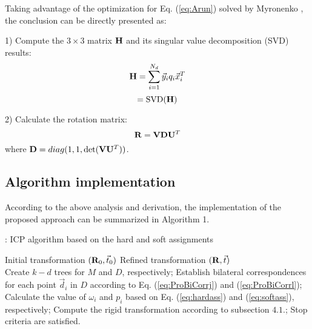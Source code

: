 \documentclass[review]{elsarticle}
\renewcommand{\algorithmicrequire}{\textbf{Input:}}  %
\renewcommand{\algorithmicensure}{\textbf{Output:}} %
\renewcommand{\algorithmicrepeat}{\textbf{Repeat:}} %
\renewcommand{\algorithmicuntil}{\textbf{Until:}} %
\begin{document}
Taking advantage of the optimization for Eq. (\ref{eq:Arun}) solved by Myronenko \cite{Myronenko09}, the conclusion can be directly presented as:

1) Compute the $3 \times 3$ matrix $\bf{H}$ and its singular value decomposition (SVD) results:
  \begin{equation}
  {\bf{H}} = \sum\limits_{i = 1}^{{N_d}} {{{\vec y}_i}} {q_i}\vec x_i^T\end{equation}
  \begin{equation}
[{\bf{U}},\Lambda ,{\bf{V}}] = {\mathop{\rm SVD}\nolimits} ({\bf{H}})
\end{equation}

2) Calculate the rotation matrix:
\begin{equation}
{\bf{R}} = {\bf{V}}{\bf{D}}{{\bf{U}}^T}
\end{equation}
where ${\bf{D}} = diag(1,1,\det ({\bf{V}}{{\bf{U}}^T}))$.




\subsection{Algorithm implementation}

According to the above analysis and derivation, the implementation of the proposed approach can be summarized in Algorithm 1.
\renewcommand{\algorithmicrequire}{\textbf{Input:}}
\renewcommand{\algorithmicensure}{\textbf{Output:}}
\renewcommand{\algorithmicrepeat}{\textbf{Repeat:}}
\renewcommand{\algorithmicuntil}{\textbf{Until:}}

    \begin{algorithm}[htbp]
        \caption{: ICP algorithm based on the hard and soft assignments}
        \begin{algorithmic}[1] %
            \Require Initial transformation $({{\bf{R}}_0},{\vec t _0})$
            \Ensure Refined transformation $({{\bf{R}}},{\vec t})$\\
            Create $k-d$ trees for $M$ and $D$, respectively;
            \Repeat
              \State Establish bilateral correspondences for each point ${\vec d _i}$ in $D$ according to Eq. (\ref{eq:ProBiCorrj}) and (\ref{eq:ProBiCorrl});
              \State Calculate the value of ${\omega _i}$ and ${p_i}$ based on Eq. (\ref{eq:hardass}) and (\ref{eq:softass}), respectively;
              \State Compute the rigid transformation according to subsection $4.1.$;
            \Until Stop criteria are satisfied.
        \end{algorithmic}
    \end{algorithm}
\end{document}
